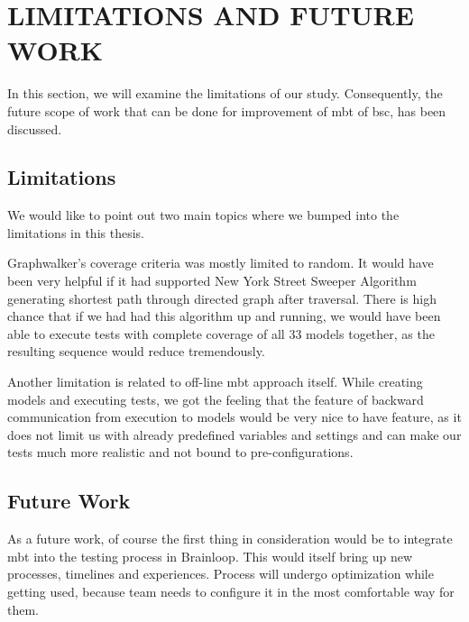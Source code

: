 \chapter{LIMITATIONS AND FUTURE WORK}
\label{chapter:limitations_and_future_work}

\par
In this section, we will examine the limitations of our study. Consequently, the future scope of work that can be done for improvement of \acrshort{mbt} of \acrshort{bsc}, has been discussed.

\section{Limitations}

\par
We would like to point out two main topics where we bumped into the limitations in this thesis. 

\par
Graphwalker's coverage criteria was mostly limited to random. It would have been very helpful if it had supported New York Street Sweeper Algorithm generating shortest path through directed graph after traversal. There is high chance that if we had had this algorithm up and running, we would have been able to execute tests with complete coverage of all 33 models together, as the resulting sequence would reduce tremendously.

\par
Another limitation is related to off-line \acrshort{mbt} approach itself. While creating models and executing tests, we got the feeling that the feature of backward communication from execution to models would be very nice to have feature, as it does not limit us with already predefined variables and settings and can make our tests much more realistic and not bound to pre-configurations.

\section{Future Work}

\par
As a future work, of course the first thing in consideration would be to integrate \acrshort{mbt} into the testing process in Brainloop. This would itself bring up new processes, timelines and experiences. Process will undergo optimization while getting used, because team needs to configure it in the most comfortable way for them.

